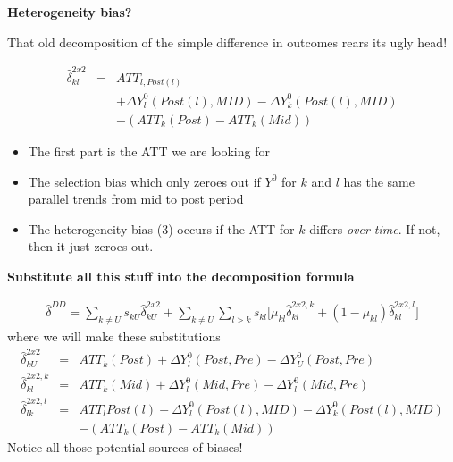 \documentclass[notes=show]{beamer}
\begin{document}
\begin{frame}[plain]
\begin{center}
\textbf{Heterogeneity bias?}
\end{center}

That old decomposition of the simple difference in outcomes rears its ugly head!

\begin{eqnarray*}
\widehat{\delta}^{2x2}_{kl} &=& ATT_{l,Post(l)} \\
&& + \Delta Y^0_l(Post(l),MID) - \Delta Y^0_k ( Post(l), MID) \\
&& - (ATT_k(Post) - ATT_k(Mid))
\end{eqnarray*}

\begin{itemize}
\item The first part is the ATT we are looking for
\item The selection bias which only zeroes out if $Y^0$ for $k$ and $l$ has the same parallel trends from mid to post period
\item The heterogeneity bias (3) occurs if the ATT for $k$ differs \emph{over time}. If not, then it just zeroes out. 
\end{itemize}



\end{frame}

\begin{frame}[plain]
\begin{center}
\textbf{Substitute all this stuff into the decomposition formula}
\end{center}

\begin{eqnarray*}	
\widehat{\delta}^{DD} = \sum_{k \neq U} s_{kU}\widehat{\delta}_{kU}^{2x2} + \sum_{k \neq U} \sum_{l>k} s_{kl}  \bigg [ \mu_{kl}\widehat{\delta}_{kl}^{2x2,k} + (1-\mu_{kl}) \widehat{\delta}_{kl}^{2x2,l} \bigg]
\end{eqnarray*}where we will make these substitutions\begin{eqnarray*}
\widehat{\delta}_{kU}^{2x2} &=& ATT_k(Post) + \Delta Y_l^0(Post,Pre) - \Delta Y_U^0(Post, Pre) \\
\widehat{\delta}_{kl}^{2x2,k} &=& ATT_k(Mid) + \Delta Y_l^0(Mid,Pre) - \Delta Y_l^0(Mid, Pre) \\
\widehat{\delta}^{2x2,l}_{lk} &=& ATT_{l}Post(l) + \Delta Y^0_l(Post(l),MID) - \Delta Y^0_k ( Post(l), MID) \\
&&- (ATT_k(Post) - ATT_k(Mid))
\end{eqnarray*}Notice all those potential sources of biases! 

\end{frame}
\end{document}
